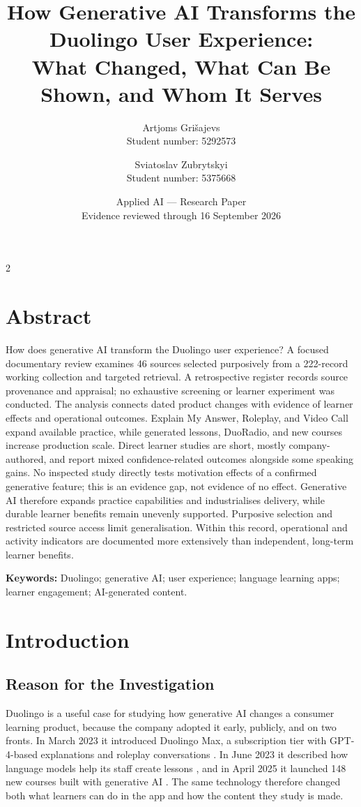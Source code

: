 \documentclass[11pt,titlepage]{article}
\title{How Generative AI Transforms the Duolingo User Experience:\\[0.5em]
\large What Changed, What Can Be Shown, and Whom It Serves}
\author{Artjoms Grišajevs \\ Student number: 5292573
\and Sviatoslav Zubrytskyi \\ Student number: 5375668}
\date{Applied AI --- Research Paper\\Evidence reviewed through 16 September 2026}
\begin{document}
\maketitle
{}
\begin{multicols}{2}
\section*{Abstract}
How does generative AI transform the Duolingo user experience? A focused documentary review examines 46 sources selected purposively from a 222-record working collection and targeted retrieval. A retrospective register records source provenance and appraisal; no exhaustive screening or learner experiment was conducted. The analysis connects dated product changes with evidence of learner effects and operational outcomes. Explain My Answer, Roleplay, and Video Call expand available practice, while generated lessons, DuoRadio, and new courses increase production scale. Direct learner studies are short, mostly company-authored, and report mixed confidence-related outcomes alongside some speaking gains. No inspected study directly tests motivation effects of a confirmed generative feature; this is an evidence gap, not evidence of no effect. Generative AI therefore expands practice capabilities and industrialises delivery, while durable learner benefits remain unevenly supported. Purposive selection and restricted source access limit generalisation. Within this record, operational and activity indicators are documented more extensively than independent, long-term learner benefits.

\noindent\textbf{Keywords:} Duolingo; generative AI; user experience; language learning apps; learner engagement; AI-generated content.
\end{multicols}
\clearpage
\tableofcontents
\clearpage
{}
\twocolumn

\section{Introduction}
\label{sec:introduction}
\subsection{Reason for the Investigation}
Duolingo is a useful case for studying how generative AI changes a consumer learning product, because the company adopted it early, publicly, and on two fronts. In March 2023 it introduced Duolingo Max, a subscription tier with GPT-4-based explanations and roleplay conversations \parencite{maxLaunch}. In June 2023 it described how language models help its staff create lessons \parencite{contentProduction}, and in April 2025 it launched 148 new courses built with generative AI \parencite{courses2025}. The same technology therefore changed both what learners can do in the app and how the content they study is made.
\end{document}
